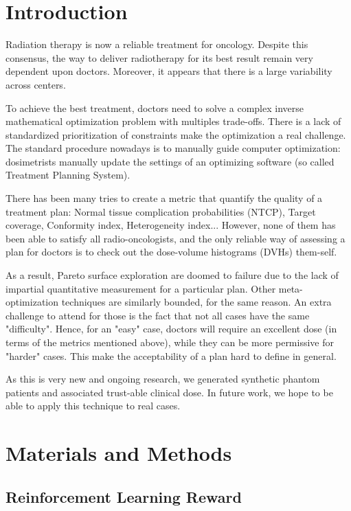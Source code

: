 \section{Introduction}

Radiation therapy is now a reliable treatment for oncology.
Despite this consensus, the way to deliver radiotherapy for its best result remain very dependent upon doctors.
Moreover, it appears that there is a large variability across centers.

To achieve the best treatment, doctors need to solve a complex inverse mathematical optimization problem with multiples trade-offs.
There is a lack of standardized prioritization of constraints make the optimization a real challenge.
The standard procedure nowadays is to manually guide computer optimization: dosimetrists manually update the settings of an optimizing software (so called Treatment Planning System).

There has been many tries to create a metric that quantify the quality of a treatment plan: Normal tissue complication probabilities (NTCP), Target coverage, Conformity index, Heterogeneity index...
However, none of them has been able to satisfy all radio-oncologists, and the only reliable way of assessing a plan for doctors is to check out the dose-volume histograms (DVHs) them-self.

As a result, Pareto surface exploration are doomed to failure due to the lack of impartial quantitative measurement for a particular plan.
Other meta-optimization techniques are similarly bounded, for the same reason.
An extra challenge to attend for those is the fact that not all cases have the same "difficulty".
Hence, for an "easy" case, doctors will require an excellent dose (in terms of the metrics mentioned above), while they can be more permissive for "harder" cases.
This make the acceptability of a plan hard to define in general.

As this is very new and ongoing research, we generated synthetic phantom patients and associated trust-able clinical dose.
In future work, we hope to be able to apply this technique to real cases.

\section{Materials and Methods}

\subsection{Reinforcement Learning Reward}

